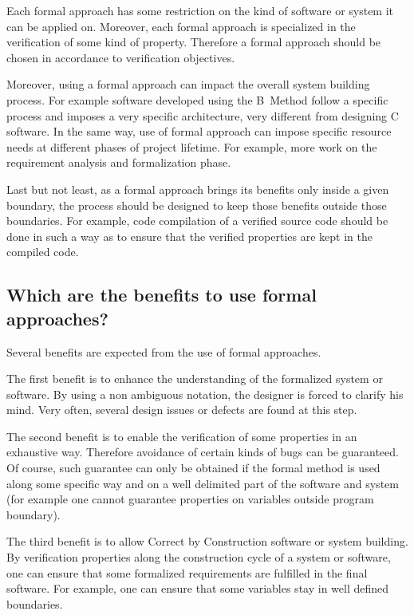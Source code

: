 Each formal approach has some restriction on the kind of software or
system it can be applied on. Moreover, each formal approach is
specialized in the verification of some kind of property. Therefore a
formal approach should be chosen in accordance to verification
objectives.

Moreover, using a formal approach can impact the overall system
building process. For example software developed using the B~Method
follow a specific process and imposes a very specific architecture,
very different from designing C software. In the same way, use of
formal approach can impose specific resource needs at different phases
of project lifetime. For example, more work on the requirement
analysis and formalization phase.

Last but not least, as a formal approach brings its benefits only
inside a given boundary, the process should be designed to keep those
benefits outside those boundaries. For example, code compilation of a
verified source code should be done in such a way as to ensure that
the verified properties are kept in the compiled code.

\subsection{Which are the benefits to use formal approaches?}

Several benefits are expected from the use of formal approaches.

The first benefit is to enhance the understanding of the formalized
system or software. By using a non ambiguous notation, the designer is
forced to clarify his mind. Very often, several design issues or
defects are found at this step.

The second benefit is to enable the verification of some properties in
an exhaustive way. Therefore avoidance of certain kinds of bugs can be
guaranteed. Of course, such guarantee can only be obtained if the
formal method is used along some specific way and on a well delimited
part of the software and system (for example one cannot guarantee
properties on variables outside program boundary).

The third benefit is to allow Correct by Construction software or
system building. By verification properties along the construction
cycle of a system or software, one can ensure that some formalized
requirements are fulfilled in the final software. For example, one can
ensure that some variables stay in well defined boundaries.
